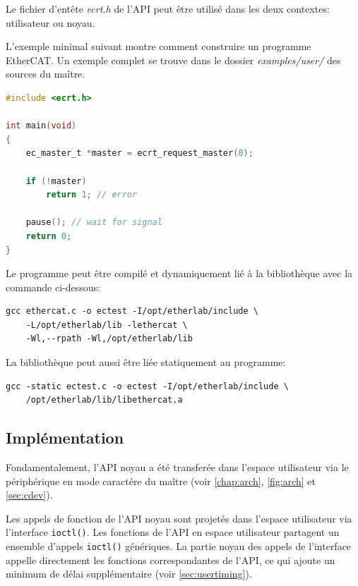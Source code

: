 \documentclass[a4paper,12pt,BCOR=6mm,bibtotoc,idxtotoc]{scrbook}
\begin{document}
Le fichier d'ent\^ete \textit{ecrt.h} de l'API peut \^etre utilis\'e
dans les deux contextes: utilisateur ou noyau.

L'exemple minimal suivant montre comment construire un programme
EtherCAT. Un exemple complet se trouve dans le dossier \textit{examples/user/}
des sources du ma\^itre.

\begin{lstlisting}[language=C]
#include <ecrt.h>

int main(void)
{
    ec_master_t *master = ecrt_request_master(0);

    if (!master)
        return 1; // error

    pause(); // wait for signal
    return 0;
}
\end{lstlisting}

Le programme peut \^etre compil\'e et dynamiquement li\'e \`a la
biblioth\`eque avec la commande ci-dessous:

\begin{lstlisting}[caption=Commande de l'\'editeur de liens pour utiliser la biblioth\`eque
    de l'espace utilisateur,
label=lst:linker-user]
gcc ethercat.c -o ectest -I/opt/etherlab/include \
    -L/opt/etherlab/lib -lethercat \
    -Wl,--rpath -Wl,/opt/etherlab/lib
\end{lstlisting}

La biblioth\`eque peut aussi \^etre li\'ee statiquement au programme:

\begin{lstlisting}
gcc -static ectest.c -o ectest -I/opt/etherlab/include \
    /opt/etherlab/lib/libethercat.a
\end{lstlisting}

\subsection{Impl\'ementation}
\label{sec:userimp}

Fondamentalement, l'API noyau a \'et\'e transfer\'ee dans l'espace
utilisateur via le p\'eriph\'erique en mode caract\'ere du ma\^itre
(voir \autoref{chap:arch}, \autoref{fig:arch} et \autoref{sec:cdev}).

Les appels de fonction de l'API noyau sont projet\'es dans l'espace
utilisateur via l'interface \lstinline+ioctl()+. Les fonctions de
l'API en espace utilisateur partagent un ensemble d'appels
\lstinline+ioctl()+ g\'en\'eriques.  La partie noyau des appels de
l'interface appelle directement les fonctions correspondantes de
l'API, ce qui ajoute un minimum de d\'elai suppl\'ementaire (voir
\autoref{sec:usertiming}).
\end{document}
